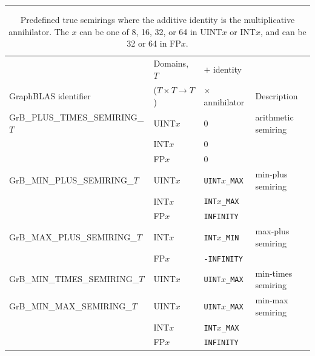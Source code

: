 \begin{table}
\centering
\begin{threeparttable}
\hrule
\caption{Predefined true semirings where the additive identity is the multiplicative 
annihilator. The $x$ can be one of 8, 16, 32, or 64 in {\sf UINT$x$} or {\sf INT$x$}, 
and can be 32 or 64 in {\sf FP$x$}.}
\label{Tab:PredefinedTrueSemirings}

\hspace*{-1.5em}
\begin{tabular}{l|l|l|l}
                                      & Domains, $T$             & $+$ identity         &                 \\
GraphBLAS identifier              & ($T \times T \rightarrow T$) & $\times$ annihilator & Description     \\ \hline
{\sf GrB\_PLUS\_TIMES\_SEMIRING\_$T$}   & {\sf UINT$x$}            & 0                    & arithmetic semiring \\
                                      & {\sf INT$x$}             & 0                    &                 \\
                                      & {\sf FP$x$}              & 0                    &                 \\
{\sf GrB\_MIN\_PLUS\_SEMIRING\_$T$}     & {\sf UINT$x$}            & {\tt UINT$x$\_MAX}   & min-plus semiring  \\
                                      & {\sf INT$x$}             & {\tt INT$x$\_MAX}    &                 \\
                                      & {\sf FP$x$}              & {\tt INFINITY}       &                 \\
{\sf GrB\_MAX\_PLUS\_SEMIRING\_$T$}     & {\sf INT$x$}             & {\tt INT$x$\_MIN}    & max-plus semiring  \\
                                      & {\sf FP$x$}              & {\tt -INFINITY}      &                 \\
{\sf GrB\_MIN\_TIMES\_SEMIRING\_$T$}    & {\sf UINT$x$}            & {\tt UINT$x$\_MAX}   & min-times semiring \\
{\sf GrB\_MIN\_MAX\_SEMIRING\_$T$}      & {\sf UINT$x$}            & {\tt UINT$x$\_MAX}   & min-max semiring   \\
                                      & {\sf INT$x$}             & {\tt INT$x$\_MAX}    &                 \\
                                      & {\sf FP$x$}              & {\tt INFINITY}       &                 \\

\end{tabular}
\end{threeparttable}
\end{table}

